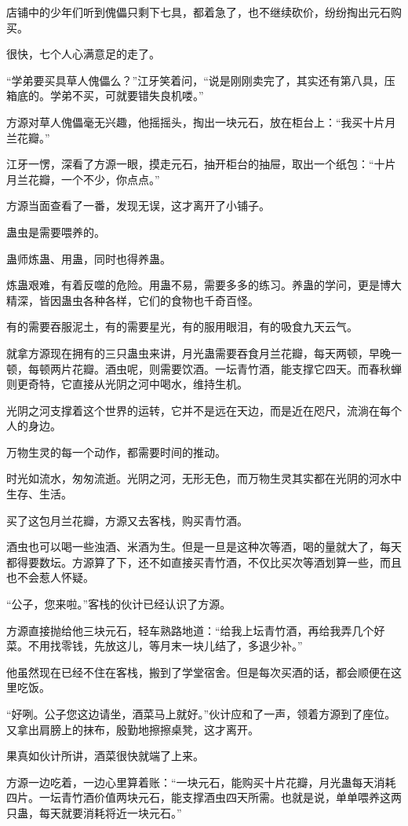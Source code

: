 \begin{this_body}
店铺中的少年们听到傀儡只剩下七具，都着急了，也不继续砍价，纷纷掏出元石购买。

很快，七个人心满意足的走了。

“学弟要买具草人傀儡么？”江牙笑着问，“说是刚刚卖完了，其实还有第八具，压箱底的。学弟不买，可就要错失良机喽。”

方源对草人傀儡毫无兴趣，他摇摇头，掏出一块元石，放在柜台上：“我买十片月兰花瓣。”

江牙一愣，深看了方源一眼，摸走元石，抽开柜台的抽屉，取出一个纸包：“十片月兰花瓣，一个不少，你点点。”

方源当面查看了一番，发现无误，这才离开了小铺子。

蛊虫是需要喂养的。

蛊师炼蛊、用蛊，同时也得养蛊。

炼蛊艰难，有着反噬的危险。用蛊不易，需要多多的练习。养蛊的学问，更是博大精深，皆因蛊虫各种各样，它们的食物也千奇百怪。

有的需要吞服泥土，有的需要星光，有的服用眼泪，有的吸食九天云气。

就拿方源现在拥有的三只蛊虫来讲，月光蛊需要吞食月兰花瓣，每天两顿，早晚一顿，每顿两片花瓣。酒虫呢，则需要饮酒。一坛青竹酒，能支撑它四天。而春秋蝉则更奇特，它直接从光阴之河中喝水，维持生机。

光阴之河支撑着这个世界的运转，它并不是远在天边，而是近在咫尺，流淌在每个人的身边。

万物生灵的每一个动作，都需要时间的推动。

时光如流水，匆匆流逝。光阴之河，无形无色，而万物生灵其实都在光阴的河水中生存、生活。

买了这包月兰花瓣，方源又去客栈，购买青竹酒。

酒虫也可以喝一些浊酒、米酒为生。但是一旦是这种次等酒，喝的量就大了，每天都得要数坛。方源算了下，还不如直接买青竹酒，不仅比买次等酒划算一些，而且也不会惹人怀疑。

“公子，您来啦。”客栈的伙计已经认识了方源。

方源直接抛给他三块元石，轻车熟路地道：“给我上坛青竹酒，再给我弄几个好菜。不用找零钱，先放这儿，等月末一块儿结了，多退少补。”

他虽然现在已经不住在客栈，搬到了学堂宿舍。但是每次买酒的话，都会顺便在这里吃饭。

“好咧。公子您这边请坐，酒菜马上就好。”伙计应和了一声，领着方源到了座位。又拿出肩膀上的抹布，殷勤地擦擦桌凳，这才离开。

果真如伙计所讲，酒菜很快就端了上来。

方源一边吃着，一边心里算着账：“一块元石，能购买十片花瓣，月光蛊每天消耗四片。一坛青竹酒价值两块元石，能支撑酒虫四天所需。也就是说，单单喂养这两只蛊，每天就要消耗将近一块元石。”


\end{this_body}
